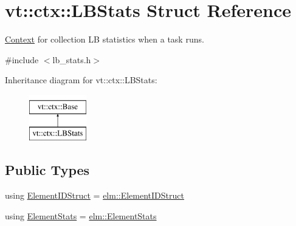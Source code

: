 \hypertarget{structvt_1_1ctx_1_1_l_b_stats}{}\section{vt\+:\+:ctx\+:\+:L\+B\+Stats Struct Reference}
\label{structvt_1_1ctx_1_1_l_b_stats}


\hyperlink{structvt_1_1ctx_1_1_context}{Context} for collection LB statistics when a task runs.  




{\ttfamily \#include $<$lb\+\_\+stats.\+h$>$}

Inheritance diagram for vt\+:\+:ctx\+:\+:L\+B\+Stats\+:\begin{figure}[H]
\begin{center}
\leavevmode
\includegraphics[height=2.000000cm]{structvt_1_1ctx_1_1_l_b_stats}
\end{center}
\end{figure}
\subsection*{Public Types}
\begin{DoxyCompactItemize}
\item 
using \hyperlink{structvt_1_1ctx_1_1_l_b_stats_a2ba0297a3c99e495b74b73abbf888bde}{Element\+I\+D\+Struct} = \hyperlink{structvt_1_1elm_1_1_element_i_d_struct}{elm\+::\+Element\+I\+D\+Struct}
\item 
using \hyperlink{structvt_1_1ctx_1_1_l_b_stats_ae1eb05f8cd4ad63a08ff3cf87ef34e1d}{Element\+Stats} = \hyperlink{structvt_1_1elm_1_1_element_stats}{elm\+::\+Element\+Stats}
\end{DoxyCompactItemize}
